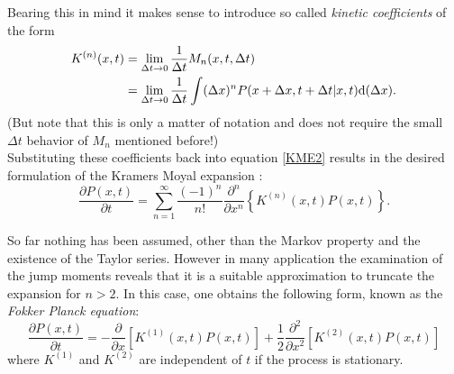 Bearing this in mind it makes sense to introduce so called \emph{kinetic coefficients} of the form
\begin{align}
    K^{(n)}(x,t) &= \lim_{\Delta t \rightarrow 0} \frac{1}{ \Delta t } M_n(x,t,\Delta t) \nonumber \\
    &=\lim_{\Delta t \rightarrow 0} \frac{1}{\Delta t} \int (\Delta x)^n P(x+\Delta x,t+\Delta t|x,t) {\rm d}(\Delta x) .
    \label{kinetic_coefficients}
\end{align}
(But note that this is only a matter of notation and does not require the small $\Delta t$ behavior of $M_n$ mentioned  before!) \\
Substituting these coefficients back into equation \eqref{KME2} results in the desired formulation of the Kramers Moyal expansion \cite{Moyal1949}:
\begin{equation}
    \frac{\partial P(x,t)}{\partial t} = \sum_{n = 1}^{\infty}\frac{(-1)^{n}}{n!}\frac{\partial^n}{\partial x^n} \left\{ K^{(n)}(x,t) P(x,t) \right\}.
    \label{Kramers Moyal expansion}
\end{equation}

So far nothing has been assumed, other than the Markov property and the existence of the Taylor series. However in many application the examination of the jump moments reveals that it is a suitable approximation to truncate the expansion for $n>2$. In this case, one obtains the following form, known as the \textit{Fokker Planck equation}:
\begin{equation}
    \boxed{    \frac{\partial P(x,t)}{\partial t} = - \frac{\partial}{\partial x} \left[K^{(1)}(x,t)P(x,t) \right] + \frac{1}{2}\frac{\partial^2}{\partial x^2}\left[ K^{(2)}(x,t)P(x,t) \right] }
    \label{FPE}
\end{equation}
where $K^{(1)}$ and $K^{(2)}$ are independent of $t$ if the process is stationary. \\
